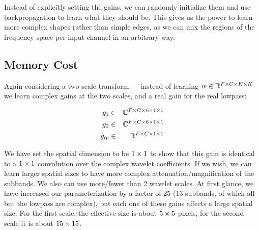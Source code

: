 Instead of explicitly setting the gains, we can randomly initialize them and use
backpropagation to learn what they should be. This gives us the power to learn
more complex shapes rather than simple edges, as we can mix the regions of the
frequency space per input channel in an arbitrary way. 

\subsection{Memory Cost}

Again considering a two scale transform --- instead of learning $w\in \reals[F
\x C\x K\x K]$ we learn complex gains at the two scales, and a real gain for the
real lowpass:

$$
\begin{align}
  g_1 & \in & \complexes[F\x C\x 6\x 1\x 1] \\
  g_2 &\in &\complexes[F\x C\x 6\x 1\x 1] \\
  g_{lp} &\in & \reals[F\x C\x 1\x 1]
\end{align}
$$

We have set the spatial dimension to be $1\x 1$ to show that this gain is
identical to a $1\x 1$ convolution over the complex wavelet coefficients. If we
wish, we can learn larger spatial sizes to have more complex
attenuation/magnification of the subbands. We also can use more/fewer than
2 wavelet scales.  At first glance, we have increased our parameterization by
  a factor of 25 (13 subbands, of which all but the lowpass are complex), but
each one of these gains affects a large spatial size. For the first scale, the
effective size is about $5\x 5$ pixels, for the second scale it is about $15\x
15$.

\begin{figure}[]
  \centering
  \makebox[\textwidth][c]{%
    \resizebox{1.1\textwidth}{!}{}
  }
  \label{fig:fwd_bwd}
\end{figure}

